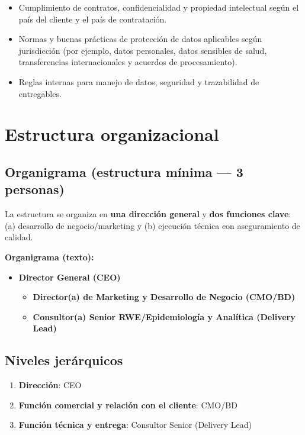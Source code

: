 \documentclass[
  spanish,
]{article}
\begin{document}
\begin{itemize}
\tightlist
\item
  Cumplimiento de contratos, confidencialidad y propiedad intelectual
  según el país del cliente y el país de contratación.
\item
  Normas y buenas prácticas de protección de datos aplicables según
  jurisdicción (por ejemplo, datos personales, datos sensibles de salud,
  transferencias internacionales y acuerdos de procesamiento).
\item
  Reglas internas para manejo de datos, seguridad y trazabilidad de
  entregables.
\end{itemize}

\section{Estructura organizacional}\label{estructura-organizacional}

\subsection{Organigrama (estructura mínima --- 3
personas)}\label{organigrama-estructura-muxednima-3-personas}

La estructura se organiza en \textbf{una dirección general} y
\textbf{dos funciones clave}: (a) desarrollo de negocio/marketing y (b)
ejecución técnica con aseguramiento de calidad.

\textbf{Organigrama (texto):}

\begin{itemize}
\tightlist
\item
  \textbf{Director General (CEO)}

  \begin{itemize}
  \tightlist
  \item
    \textbf{Director(a) de Marketing y Desarrollo de Negocio (CMO/BD)}
  \item
    \textbf{Consultor(a) Senior RWE/Epidemiología y Analítica (Delivery
    Lead)}
  \end{itemize}
\end{itemize}

\subsection{Niveles jerárquicos}\label{niveles-jeruxe1rquicos}

\begin{enumerate}
\def\labelenumi{\arabic{enumi}.}
\tightlist
\item
  \textbf{Dirección}: CEO\\
\item
  \textbf{Función comercial y relación con el cliente}: CMO/BD\\
\item
  \textbf{Función técnica y entrega}: Consultor Senior (Delivery Lead)
\end{enumerate}
\end{document}
